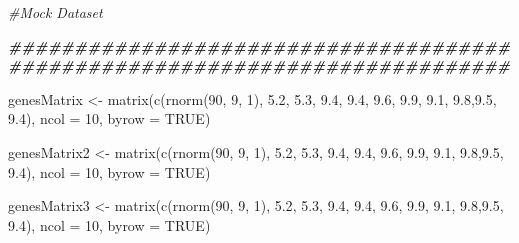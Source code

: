 \documentclass[
]{article}
\newenvironment{Shaded}{\begin{snugshade}}{\end{snugshade}}
\newcommand{\AttributeTok}[1]{\textcolor[rgb]{0.77,0.63,0.00}{#1}}
\newcommand{\CommentTok}[1]{\textcolor[rgb]{0.56,0.35,0.01}{\textit{#1}}}
\newcommand{\ConstantTok}[1]{\textcolor[rgb]{0.00,0.00,0.00}{#1}}
\newcommand{\DecValTok}[1]{\textcolor[rgb]{0.00,0.00,0.81}{#1}}
\newcommand{\DocumentationTok}[1]{\textcolor[rgb]{0.56,0.35,0.01}{\textbf{\textit{#1}}}}
\newcommand{\FloatTok}[1]{\textcolor[rgb]{0.00,0.00,0.81}{#1}}
\newcommand{\FunctionTok}[1]{\textcolor[rgb]{0.00,0.00,0.00}{#1}}
\newcommand{\NormalTok}[1]{#1}
\newcommand{\OtherTok}[1]{\textcolor[rgb]{0.56,0.35,0.01}{#1}}
\begin{document}
\begin{Shaded}
\begin{Highlighting}[]
\CommentTok{\#Mock Dataset}

\DocumentationTok{\#\#\#\#\#\#\#\#\#\#\#\#\#\#\#\#\#\#\#\#\#\#\#\#\#\#\#\#\#\#\#\#\#\#\#\#\#\#\#\#\#\#\#\#\#\#\#\#\#\#\#\#\#\#\#\#\#\#\#\#\#\#\#\#\#\#\#\#\#\#\#\#\#\#\#\#}

\NormalTok{  genesMatrix }\OtherTok{\textless{}{-}} \FunctionTok{matrix}\NormalTok{(}\FunctionTok{c}\NormalTok{(}\FunctionTok{rnorm}\NormalTok{(}\DecValTok{90}\NormalTok{, }\DecValTok{9}\NormalTok{, }\DecValTok{1}\NormalTok{),}
                         \FloatTok{5.2}\NormalTok{, }\FloatTok{5.3}\NormalTok{, }\FloatTok{9.4}\NormalTok{, }\FloatTok{9.4}\NormalTok{, }\FloatTok{9.6}\NormalTok{, }\FloatTok{9.9}\NormalTok{, }\FloatTok{9.1}\NormalTok{, }\FloatTok{9.8}\NormalTok{,}\FloatTok{9.5}\NormalTok{, }\FloatTok{9.4}\NormalTok{),}
              \AttributeTok{ncol =} \DecValTok{10}\NormalTok{, }\AttributeTok{byrow =} \ConstantTok{TRUE}\NormalTok{)}

\NormalTok{  genesMatrix2 }\OtherTok{\textless{}{-}} \FunctionTok{matrix}\NormalTok{(}\FunctionTok{c}\NormalTok{(}\FunctionTok{rnorm}\NormalTok{(}\DecValTok{90}\NormalTok{, }\DecValTok{9}\NormalTok{, }\DecValTok{1}\NormalTok{),}
                         \FloatTok{5.2}\NormalTok{, }\FloatTok{5.3}\NormalTok{, }\FloatTok{9.4}\NormalTok{, }\FloatTok{9.4}\NormalTok{, }\FloatTok{9.6}\NormalTok{, }\FloatTok{9.9}\NormalTok{, }\FloatTok{9.1}\NormalTok{, }\FloatTok{9.8}\NormalTok{,}\FloatTok{9.5}\NormalTok{, }\FloatTok{9.4}\NormalTok{),}
              \AttributeTok{ncol =} \DecValTok{10}\NormalTok{, }\AttributeTok{byrow =} \ConstantTok{TRUE}\NormalTok{)}

\NormalTok{    genesMatrix3 }\OtherTok{\textless{}{-}} \FunctionTok{matrix}\NormalTok{(}\FunctionTok{c}\NormalTok{(}\FunctionTok{rnorm}\NormalTok{(}\DecValTok{90}\NormalTok{, }\DecValTok{9}\NormalTok{, }\DecValTok{1}\NormalTok{),}
                         \FloatTok{5.2}\NormalTok{, }\FloatTok{5.3}\NormalTok{, }\FloatTok{9.4}\NormalTok{, }\FloatTok{9.4}\NormalTok{, }\FloatTok{9.6}\NormalTok{, }\FloatTok{9.9}\NormalTok{, }\FloatTok{9.1}\NormalTok{, }\FloatTok{9.8}\NormalTok{,}\FloatTok{9.5}\NormalTok{, }\FloatTok{9.4}\NormalTok{),}
              \AttributeTok{ncol =} \DecValTok{10}\NormalTok{, }\AttributeTok{byrow =} \ConstantTok{TRUE}\NormalTok{)}
  

\end{Highlighting}
\end{Shaded}
\end{document}
